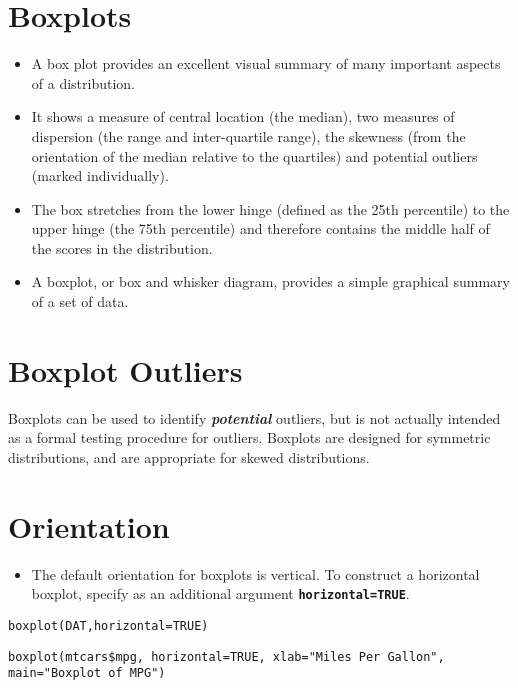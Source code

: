 \documentclass[a4paper,12pt]{article}
\begin{document}
\section*{Boxplots}
\begin{itemize}
    \item 
A box plot provides an excellent visual summary of many important aspects of a distribution. 
\item It shows a measure of central location (the median), two measures of dispersion (the range and inter-quartile range), the skewness (from the orientation of the median relative to the quartiles) and potential outliers (marked individually). 

\item The box stretches from the lower hinge (defined as the 25th percentile) to the upper hinge (the 75th percentile) and therefore contains the middle half of the scores in the distribution.
\item A boxplot, or box and whisker diagram, provides a simple graphical summary of a set of data. 

\end{itemize}
\section*{Boxplot Outliers}
Boxplots can be used to identify \textbf{\textit{potential}} outliers, but is not actually intended as a formal testing procedure for outliers. Boxplots are designed for symmetric distributions, and are appropriate for skewed distributions.
\section*{Orientation}
\begin{itemize}
\item The default orientation for boxplots is vertical. To construct a horizontal boxplot, specify as an additional argument
\texttt{\textbf{horizontal=TRUE}}.
\end{itemize}
\begin{framed}
\begin{verbatim}
boxplot(DAT,horizontal=TRUE)
\end{verbatim}
\end{framed}




\footnotesize
\begin{framed}
\begin{verbatim}
boxplot(mtcars$mpg, horizontal=TRUE, xlab="Miles Per Gallon",
main="Boxplot of MPG")
\end{verbatim}
\end{framed}
\end{document}
